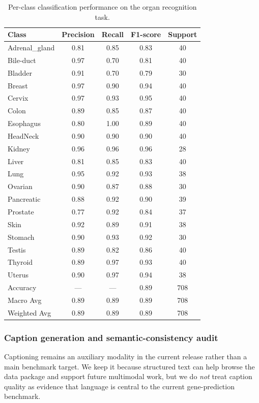 \documentclass[sigconf,review]{acmart}
\begin{document}
\begin{table}[t]
\centering
\scriptsize
\setlength{\tabcolsep}{6pt}
\begin{tabular}{lcccc}
\toprule
\textbf{Class} & \textbf{Precision} & \textbf{Recall} & \textbf{F1-score} & \textbf{Support} \\
\midrule
Adrenal\_gland & 0.81 & 0.85 & 0.83 & 40 \\
Bile-duct      & 0.97 & 0.70 & 0.81 & 40 \\
Bladder        & 0.91 & 0.70 & 0.79 & 30 \\
Breast         & 0.97 & 0.90 & 0.94 & 40 \\
Cervix         & 0.97 & 0.93 & 0.95 & 40 \\
Colon          & 0.89 & 0.85 & 0.87 & 40 \\
Esophagus      & 0.80 & 1.00 & 0.89 & 40 \\
HeadNeck       & 0.90 & 0.90 & 0.90 & 40 \\
Kidney         & 0.96 & 0.96 & 0.96 & 28 \\
Liver          & 0.81 & 0.85 & 0.83 & 40 \\
Lung           & 0.95 & 0.92 & 0.93 & 38 \\
Ovarian        & 0.90 & 0.87 & 0.88 & 30 \\
Pancreatic     & 0.88 & 0.92 & 0.90 & 39 \\
Prostate       & 0.77 & 0.92 & 0.84 & 37 \\
Skin           & 0.92 & 0.89 & 0.91 & 38 \\
Stomach        & 0.90 & 0.93 & 0.92 & 30 \\
Testis         & 0.89 & 0.82 & 0.86 & 40 \\
Thyroid        & 0.89 & 0.97 & 0.93 & 40 \\
Uterus         & 0.90 & 0.97 & 0.94 & 38 \\
\midrule
Accuracy       & ---  & ---  & 0.89 & 708 \\
Macro Avg      & 0.89 & 0.89 & 0.89 & 708 \\
Weighted Avg   & 0.89 & 0.89 & 0.89 & 708 \\
\bottomrule
\end{tabular}
\caption{Per-class classification performance on the organ recognition task.}
\label{tab:organ_classification}
\end{table}

\subsubsection{Caption generation and semantic-consistency audit}
\label{sec:caption_audit}
\noindent
Captioning remains an auxiliary modality in the current release rather than a main benchmark target. We keep it because structured text can help browse the data package and support future multimodal work, but we do \emph{not} treat caption quality as evidence that language is central to the current gene-prediction benchmark.
\end{document}
